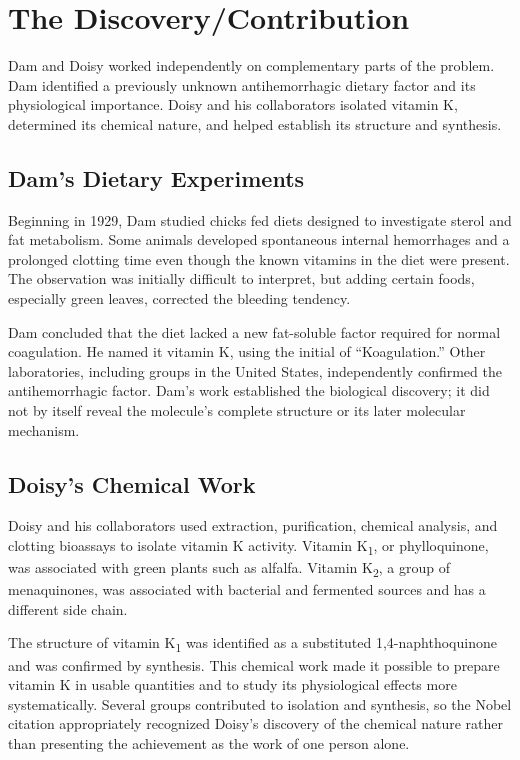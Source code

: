 \section{The Discovery/Contribution}

Dam and Doisy worked independently on complementary parts of the problem. Dam identified a previously unknown antihemorrhagic dietary factor and its physiological importance. Doisy and his collaborators isolated vitamin K, determined its chemical nature, and helped establish its structure and synthesis.\cite{nobel-1943,vitamin-k-history}

\subsection{Dam's Dietary Experiments}

Beginning in 1929, Dam studied chicks fed diets designed to investigate sterol and fat metabolism. Some animals developed spontaneous internal hemorrhages and a prolonged clotting time even though the known vitamins in the diet were present. The observation was initially difficult to interpret, but adding certain foods, especially green leaves, corrected the bleeding tendency.

Dam concluded that the diet lacked a new fat-soluble factor required for normal coagulation. He named it vitamin K, using the initial of ``Koagulation.'' Other laboratories, including groups in the United States, independently confirmed the antihemorrhagic factor. Dam's work established the biological discovery; it did not by itself reveal the molecule's complete structure or its later molecular mechanism.

\subsection{Doisy's Chemical Work}

Doisy and his collaborators used extraction, purification, chemical analysis, and clotting bioassays to isolate vitamin K activity. Vitamin K\textsubscript{1}, or phylloquinone, was associated with green plants such as alfalfa. Vitamin K\textsubscript{2}, a group of menaquinones, was associated with bacterial and fermented sources and has a different side chain.

The structure of vitamin K\textsubscript{1} was identified as a substituted 1,4-naphthoquinone and was confirmed by synthesis. This chemical work made it possible to prepare vitamin K in usable quantities and to study its physiological effects more systematically. Several groups contributed to isolation and synthesis, so the Nobel citation appropriately recognized Doisy's discovery of the chemical nature rather than presenting the achievement as the work of one person alone.\cite{vitamin-k-history}

